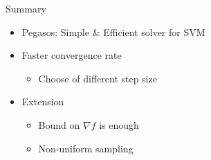 \begin{frame}{Summary}
    \begin{itemize}
        \item Pegasos: Simple $\&$ Efficient solver for SVM
        \item Faster convergence rate
            \begin{itemize}
                \item Choose of different step size
            \end{itemize}
        \item Extension
            \begin{itemize}
                \item Bound on $\nabla f$ is enough
                \item Non-uniform sampling
            \end{itemize}
    \end{itemize}
\end{frame}

